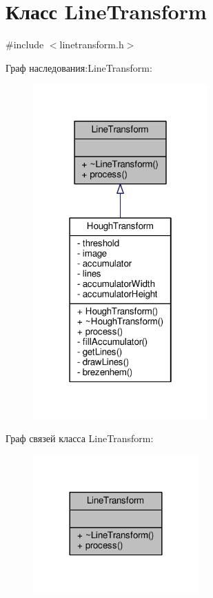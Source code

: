 \hypertarget{class_line_transform}{}\section{Класс Line\+Transform}
\label{class_line_transform}


{\ttfamily \#include $<$linetransform.\+h$>$}



Граф наследования\+:Line\+Transform\+:
\nopagebreak
\begin{figure}[H]
\begin{center}
\leavevmode
\includegraphics[width=190pt]{da/d01/class_line_transform__inherit__graph}
\end{center}
\end{figure}


Граф связей класса Line\+Transform\+:
\nopagebreak
\begin{figure}[H]
\begin{center}
\leavevmode
\includegraphics[width=180pt]{d3/d2d/class_line_transform__coll__graph}
\end{center}
\end{figure}

